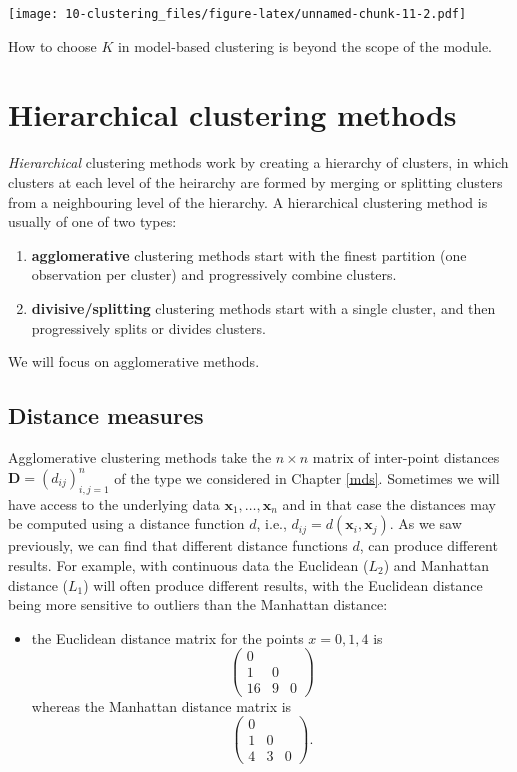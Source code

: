 \documentclass[
]{book}
\providecommand{\tightlist}{%
  \setlength{\itemsep}{0pt}\setlength{\parskip}{0pt}}
\theoremstyle{definition}
\theoremstyle{definition}
\theoremstyle{definition}
\theoremstyle{definition}
\theoremstyle{remark}
\begin{document}
\texttt{[image: 10-clustering\_files/figure-latex/unnamed-chunk-11-2.pdf]}

How to choose \(K\) in model-based clustering is beyond the scope of the module.

\hypertarget{hierarchical-clustering-methods}{%
\section{Hierarchical clustering methods}\label{hierarchical-clustering-methods}}

\emph{Hierarchical} clustering methods work by creating a hierarchy of clusters, in which clusters at each level of the heirarchy are formed by merging or splitting clusters from a neighbouring level of the hierarchy. A hierarchical clustering method is usually of one of two types:

\begin{enumerate}
\def\labelenumi{\arabic{enumi}.}
\item
  \textbf{agglomerative} clustering methods start with the finest partition (one observation per cluster) and progressively combine clusters.
\item
  \textbf{divisive/splitting} clustering methods start with a single cluster, and then progressively splits or divides clusters.
\end{enumerate}

We will focus on agglomerative methods.

\hypertarget{distance-measures}{%
\subsection{Distance measures}\label{distance-measures}}

Agglomerative clustering methods take the \(n \times n\) matrix of inter-point distances \(\mathbf D=(d_{ij})_{i,j=1}^n\) of the type we considered in Chapter \ref{mds}. Sometimes we will have access to the underlying data \(\mathbf x_1, \ldots, \mathbf x_n\) and in that case the distances may be computed using a distance function \(d\), i.e., \(d_{ij}=d(\mathbf x_i, \mathbf x_j)\).
As we saw previously, we can find that different distance functions \(d\), can produce different results. For example, with continuous data the Euclidean (\(L_2\)) and Manhattan distance (\(L_1\)) will often produce different results, with the Euclidean distance being more sensitive to outliers than the Manhattan distance:

\begin{itemize}
\tightlist
\item
  the Euclidean distance matrix for the points \(x=0, 1,4\) is
  \[\begin{pmatrix}0&&\\1&0\\
  16&9&0\end{pmatrix}\]
  whereas the Manhattan distance matrix is
  \[\begin{pmatrix}0&&\\1&0\\
  4&3&0\end{pmatrix}.\]
\end{itemize}
\end{document}
